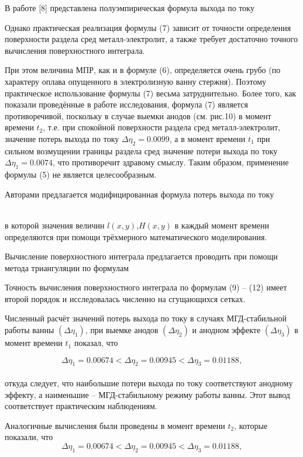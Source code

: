 \documentclass{article}
\begin{document}
В работе [8] представлена полуэмпирическая формула выхода по току

%

Однако практическая реализация формулы (7) зависит от точности определения поверхности раздела сред металл-электролит, а также требует достаточно точного вычисления поверхностного интеграла. 

При этом величина МПР, как и в формуле (6), определяется очень грубо (по характеру оплава опущенного в электролизную ванну стержня). Поэтому практическое использование формулы (7) весьма затруднительно. Более того, как показали проведённые в работе исследования, формула (7) является противоречивой, поскольку в случае выемки анодов (см. рис.10) в момент времени $t_2$, т.е. при спокойной поверхности раздела сред металл-электролит, значение  потерь выхода по току $\Delta\eta_2 = 0.0099$, а в момент времени $t_1$ при сильном возмущении границы раздела сред значение потери выхода по току $\Delta\eta_1 = 0.0074$, что противоречит здравому смыслу.  Таким образом, применение формулы (5) не является целесообразным.

Авторами предлагается модифицированная формула потерь выхода по току 

%
\\
в которой значения величин $l(x,y)$,$ H(x,y)$ в каждый момент времени определяются при помощи трёхмерного математического моделирования.

Вычисление поверхностного интеграла предлагается проводить при помощи метода триангуляции по формулам 

%

Точность вычисления поверхностного интеграла по формулам (9) – (12) имеет второй порядок и исследовалась численно на сгущающихся сетках.

Численный расчёт значений потерь выхода по току в случаях МГД-стабильной работы ванны $(\Delta\eta_1)$, при выемке анодов $(\Delta\eta_2)$ и анодном эффекте $(\Delta\eta_3)$ в момент времени $t_1$ показал, что 

\[ \Delta\eta_1 = 0.00674 < \Delta\eta_2 = 0.00945 < \Delta\eta_3 = 0.01188, \]
\\
откуда следует, что наибольшие потери выхода по току соответствуют анодному эффекту, а наименьшие – МГД-стабильному режиму работы ванны. Этот вывод соответствует практическим наблюдениям.

Аналогичные вычисления были проведены в момент времени $t_2$, которые показали, что
\[ \Delta\eta_1 = 0.00674 < \Delta\eta_2 = 0.00945 < \Delta\eta_3 = 0.01188, \]
\end{document}
